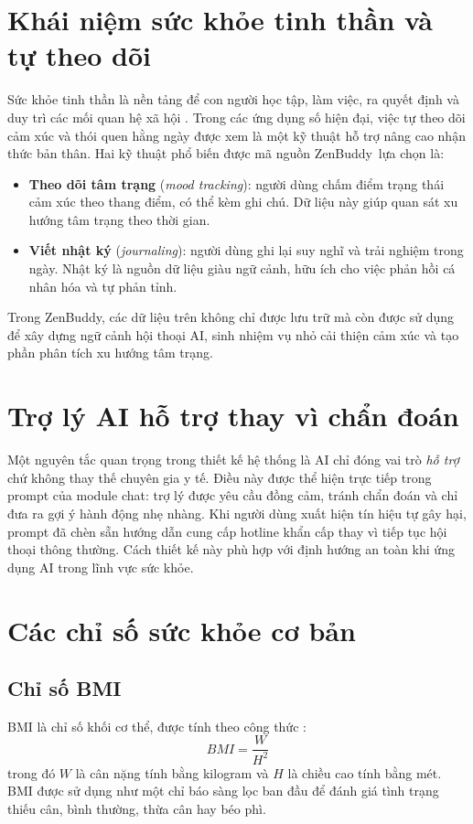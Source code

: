 \documentclass{zenbuddy-report}
\newcommand{\appname}{ZenBuddy}
\begin{document}
\section{Khái niệm sức khỏe tinh thần và tự theo dõi}
Sức khỏe tinh thần là nền tảng để con người học tập, làm việc, ra quyết định và duy trì các mối quan hệ xã hội \cite{who-mental-health}. Trong các ứng dụng số hiện đại, việc tự theo dõi cảm xúc và thói quen hằng ngày được xem là một kỹ thuật hỗ trợ nâng cao nhận thức bản thân. Hai kỹ thuật phổ biến được mã nguồn \appname\ lựa chọn là:
\begin{itemize}
  \item \textbf{Theo dõi tâm trạng} (\textit{mood tracking}): người dùng chấm điểm trạng thái cảm xúc theo thang điểm, có thể kèm ghi chú. Dữ liệu này giúp quan sát xu hướng tâm trạng theo thời gian.
  \item \textbf{Viết nhật ký} (\textit{journaling}): người dùng ghi lại suy nghĩ và trải nghiệm trong ngày. Nhật ký là nguồn dữ liệu giàu ngữ cảnh, hữu ích cho việc phản hồi cá nhân hóa và tự phản tỉnh.
\end{itemize}

Trong \appname, các dữ liệu trên không chỉ được lưu trữ mà còn được sử dụng để xây dựng ngữ cảnh hội thoại AI, sinh nhiệm vụ nhỏ cải thiện cảm xúc và tạo phần phân tích xu hướng tâm trạng.

\section{Trợ lý AI hỗ trợ thay vì chẩn đoán}
Một nguyên tắc quan trọng trong thiết kế hệ thống là AI chỉ đóng vai trò \textit{hỗ trợ} chứ không thay thế chuyên gia y tế. Điều này được thể hiện trực tiếp trong prompt của module chat: trợ lý được yêu cầu đồng cảm, tránh chẩn đoán và chỉ đưa ra gợi ý hành động nhẹ nhàng. Khi người dùng xuất hiện tín hiệu tự gây hại, prompt đã chèn sẵn hướng dẫn cung cấp hotline khẩn cấp thay vì tiếp tục hội thoại thông thường. Cách thiết kế này phù hợp với định hướng an toàn khi ứng dụng AI trong lĩnh vực sức khỏe.

\section{Các chỉ số sức khỏe cơ bản}
\subsection{Chỉ số BMI}
BMI là chỉ số khối cơ thể, được tính theo công thức \cite{cdc-bmi}:
\begin{equation}
BMI = \frac{W}{H^2}
\end{equation}
trong đó \(W\) là cân nặng tính bằng kilogram và \(H\) là chiều cao tính bằng mét. BMI được sử dụng như một chỉ báo sàng lọc ban đầu để đánh giá tình trạng thiếu cân, bình thường, thừa cân hay béo phì.
\end{document}
